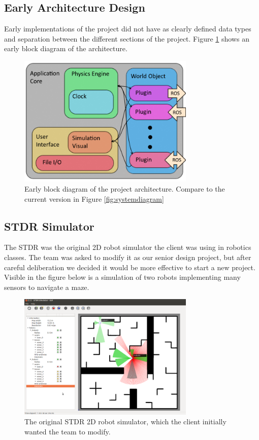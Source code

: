 \subsection{Early Architecture Design}
Early implementations of the project did not have as clearly defined data types and separation between the different sections of the project. Figure \ref{fig:prototypediagram} shows an early block diagram of the architecture. 

\begin{figure}[h]
	\centering
	\includegraphics[width=0.75\textwidth]{./images_design/sysarch}
	\caption{Early block diagram of the project architecture. Compare to the current version in Figure \ref{fig:systemdiagram}}
	\label{fig:prototypediagram}
\end{figure}

\subsection{STDR Simulator}

The STDR was the original 2D robot simulator the client was using in robotics classes. The team was asked to modify it as our senior design project, but after careful deliberation we decided it would be more effective to start a new project. Visible in the figure below is a simulation of two robots implementing many sensors to navigate a maze.

\begin{figure}[!htb]
	\begin{center}
		\includegraphics[width=0.75\textwidth]{./Images/Sprint0_STDR}
	\end{center}
	\caption{The original STDR 2D robot simulator, which the client initially wanted the team to modify.  \label{stdr}}
\end{figure}

